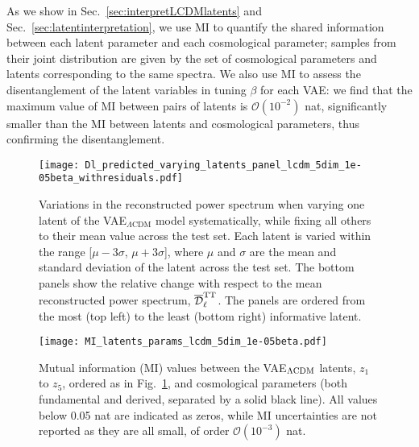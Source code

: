 \documentclass[aps, prd, reprint, superscriptaddress, nofootinbib, bibnotes]{revtex4-2}
\begin{document}
As we show in Sec.~\ref{sec:interpretLCDMlatents} and Sec.~\ref{sec:latentinterpretation}, we use MI to quantify the shared information between each latent parameter and each cosmological parameter; samples from their joint distribution are given by the set of cosmological parameters and latents corresponding to the same spectra. We also use MI to assess the disentanglement of the latent variables in tuning $\beta$ for each VAE: we find that the maximum value of MI between pairs of latents is $\mathcal{O}(10^{-2})$ nat, significantly smaller than the MI between latents and cosmological parameters, thus confirming the disentanglement.

\begin{figure*}
    \centering
    \texttt{[image: Dl\_predicted\_varying\_latents\_panel\_lcdm\_5dim\_1e-05beta\_withresiduals.pdf]}
    \vspace{-0.4cm}
    \caption{Variations in the reconstructed power spectrum when varying one latent of the VAE$_{\Lambda\mathrm{CDM}}$ model systematically, while fixing all others to their mean value across the test set. Each latent is varied within the range [$\mu -3\sigma$, $\mu +3\sigma$], where $\mu$ and $\sigma$ are the mean and standard deviation of the latent across the test set. The bottom panels show the relative change with respect to the mean reconstructed power spectrum, $\overline{\mathcal{D}}_{\ell}^{\rm{TT}}$. The panels are ordered from the most (top left) to the least (bottom right) informative latent.
    }
    \label{fig:lcdm_traversals}
\end{figure*}
\begin{figure}
\centering
\texttt{[image: MI\_latents\_params\_lcdm\_5dim\_1e-05beta.pdf]}
\vspace{-0.4cm}
\caption{Mutual information (MI) values between the VAE$_{\Lambda \rm CDM}$ latents, $z_1$ to $z_5$, ordered as in Fig.~\ref{fig:lcdm_traversals}, and cosmological parameters (both fundamental and derived, separated by a solid black line). All values below 0.05 nat are indicated as zeros, while MI uncertainties are not reported as they are all small, of order $\mathcal{O}(10^{-3})$ nat.}
\label{fig:MI_values_lcdm}
\end{figure}
\end{document}
